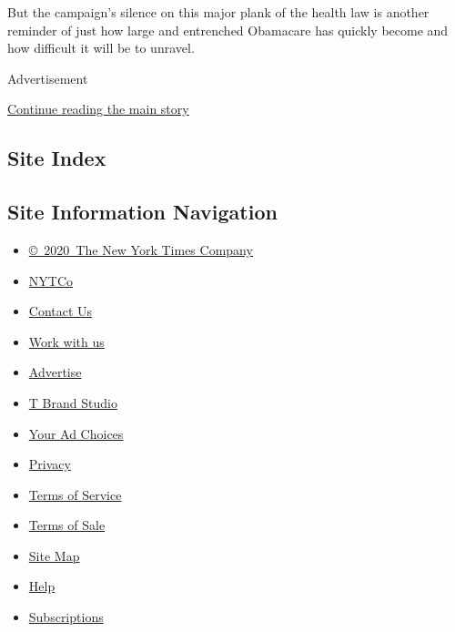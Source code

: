 But the campaign's silence on this major plank of the health law is
another reminder of just how large and entrenched Obamacare has quickly
become and how difficult it will be to unravel.

Advertisement

\protect\hyperlink{after-bottom}{Continue reading the main story}

\hypertarget{site-index}{%
\subsection{Site Index}\label{site-index}}

\hypertarget{site-information-navigation}{%
\subsection{Site Information
Navigation}\label{site-information-navigation}}

\begin{itemize}
\tightlist
\item
  \href{https://help.nytimes.com/hc/en-us/articles/115014792127-Copyright-notice}{©~2020~The
  New York Times Company}
\end{itemize}

\begin{itemize}
\tightlist
\item
  \href{https://www.nytco.com/}{NYTCo}
\item
  \href{https://help.nytimes.com/hc/en-us/articles/115015385887-Contact-Us}{Contact
  Us}
\item
  \href{https://www.nytco.com/careers/}{Work with us}
\item
  \href{https://nytmediakit.com/}{Advertise}
\item
  \href{http://www.tbrandstudio.com/}{T Brand Studio}
\item
  \href{https://www.nytimes.com/privacy/cookie-policy\#how-do-i-manage-trackers}{Your
  Ad Choices}
\item
  \href{https://www.nytimes.com/privacy}{Privacy}
\item
  \href{https://help.nytimes.com/hc/en-us/articles/115014893428-Terms-of-service}{Terms
  of Service}
\item
  \href{https://help.nytimes.com/hc/en-us/articles/115014893968-Terms-of-sale}{Terms
  of Sale}
\item
  \href{https://spiderbites.nytimes.com}{Site Map}
\item
  \href{https://help.nytimes.com/hc/en-us}{Help}
\item
  \href{https://www.nytimes.com/subscription?campaignId=37WXW}{Subscriptions}
\end{itemize}
